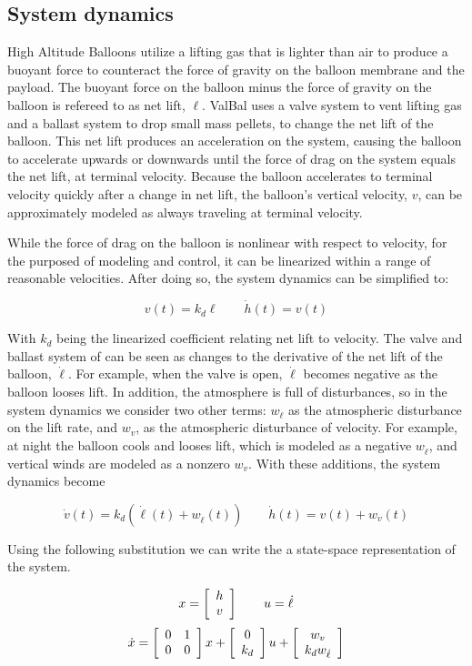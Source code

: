 \documentclass[11pt]{scrartcl} %
\begin{document}
\subsection{System dynamics}

High Altitude Balloons utilize a lifting gas that is lighter than air to produce a buoyant force to counteract the force of gravity on the balloon membrane and the payload. The buoyant force on the balloon minus the force of gravity on the balloon is refereed to as net lift, $\ell$. ValBal uses a valve system to vent lifting gas and a ballast system to drop small mass pellets, to change the net lift of the balloon. This net lift produces an acceleration on the system, causing the balloon to accelerate upwards or downwards until the force of drag on the system equals the net lift, at terminal velocity. Because the balloon accelerates to terminal velocity quickly after a change in net lift, the balloon's vertical velocity, $v$, can be approximately modeled as always traveling at terminal velocity.

While the force of drag on the balloon is nonlinear with respect to velocity, for the purposed of modeling and control, it can be linearized within a range of reasonable velocities. After doing so, the system dynamics can be simplified to:

\[ v(t) = k_d \ell \qquad \dot h(t) = v(t)\]

With $k_d$ being the linearized coefficient relating net lift to velocity. The valve and ballast system of can be seen as changes to the derivative of the net lift of the balloon, $\dot \ell$. For example, when the valve is open, $\dot \ell$ becomes negative as the balloon looses lift. In addition, the atmosphere is full of disturbances, so in the system dynamics we consider two other terms: $w_{\dot \ell}$ as the atmospheric disturbance on the lift rate, and $w_v$, as the atmospheric disturbance of velocity. For example, at night the balloon cools and looses lift, which is modeled as a negative $w_{\dot \ell}$, and vertical winds are modeled as a nonzero $w_v$. With these additions, the system dynamics become

\[ \dot v(t) = k_d(\dot \ell(t) + w_{\dot \ell}(t)) \qquad \dot h(t) = v(t) + w_v(t) \]

Using the following substitution we can write the a state-space representation of the system. 

\[x = \mx{c}{h \\ v} \qquad u = \dot \ell\]
\[\dot x = \mx{cc}{0 & 1 \\ 0 & 0}x + \mx{cc}{0 \\ k_d} u + \mx{c}{w_v \\ k_d w_{\dot \ell}}\]
\end{document}
